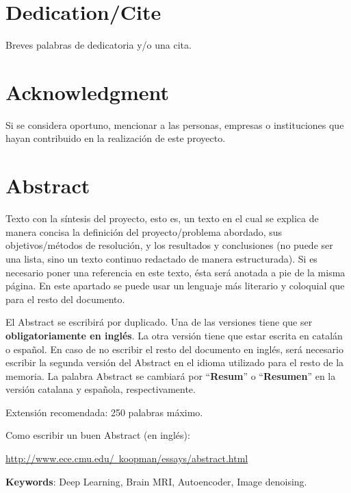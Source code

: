 \chapter*{Dedication/Cite}

Breves palabras de dedicatoria y/o una cita.

\chapter*{Acknowledgment}

Si se considera oportuno, mencionar a las personas, empresas o instituciones que hayan contribuido en la realización de este proyecto.

\chapter*{Abstract}


\onehalfspacing

Texto con la síntesis del proyecto, esto es, un texto en el cual se explica de manera concisa la definición del proyecto/problema abordado, sus objetivos/métodos de resolución, y los resultados y conclusiones (no puede ser una lista, sino un texto continuo redactado de manera estructurada). Si es necesario poner una referencia en este texto, ésta será anotada a pie de la misma página. En este apartado se puede usar un lenguaje más literario y coloquial que para el resto del documento.

El Abstract se escribirá por duplicado. Una de las versiones tiene que ser \textbf{obligatoriamente en inglés}. La otra versión tiene que estar escrita en catalán o español. En caso de no escribir el resto del documento en inglés, será necesario escribir la segunda versión del Abstract en el idioma utilizado para el resto de la memoria. La palabra Abstract se cambiará por ``\textbf{Resum}'' o ``\textbf{Resumen}'' en la versión catalana y española, respectivamente. 

Extensión recomendada: 250 palabras máximo.

Como escribir un buen Abstract (en inglés):

\href{http://www.ece.cmu.edu/~koopman/essays/abstract.html}{http://www.ece.cmu.edu/~koopman/essays/abstract.html}

\vspace{1.5cm}

\textbf{Keywords}: Deep Learning, Brain MRI, Autoencoder, Image denoising.
